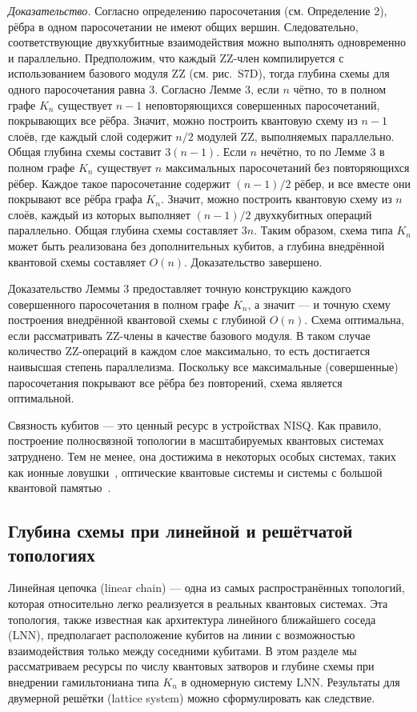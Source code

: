 \textit{Доказательство.} Согласно определению паросочетания (см. Определение
2), рёбра в одном паросочетании не имеют общих вершин. Следовательно,
соответствующие двухкубитные взаимодействия можно выполнять одновременно и
параллельно. Предположим, что каждый ZZ-член компилируется с использованием
базового модуля ZZ (см. рис.~S7D), тогда глубина схемы для одного паросочетания
равна 3. Согласно Лемме 3, если $n$ чётно, то в полном графе $K_n$ существует
$n - 1$ неповторяющихся совершенных паросочетаний, покрывающих все рёбра.
Значит, можно построить квантовую схему из $n - 1$ слоёв, где каждый слой
содержит $n/2$ модулей ZZ, выполняемых параллельно. Общая глубина схемы
составит $3(n - 1)$. Если $n$ нечётно, то по Лемме 3 в полном графе $K_n$
существует $n$ максимальных паросочетаний без повторяющихся рёбер. Каждое такое
паросочетание содержит $(n - 1)/2$ рёбер, и все вместе они покрывают все рёбра
графа $K_n$. Значит, можно построить квантовую схему из $n$ слоёв, каждый из
которых выполняет $(n - 1)/2$ двухкубитных операций параллельно. Общая глубина
схемы составляет $3n$. Таким образом, схема типа $K_n$ может быть реализована
без дополнительных кубитов, а глубина внедрённой квантовой схемы составляет
$O(n)$. Доказательство завершено.

Доказательство Леммы 3 предоставляет точную конструкцию каждого совершенного
паросочетания в полном графе $K_n$, а значит — и точную схему построения
внедрённой квантовой схемы с глубиной $O(n)$. Схема оптимальна, если
рассматривать ZZ-члены в качестве базового модуля. В таком случае количество
ZZ-операций в каждом слое максимально, то есть достигается наивысшая степень
параллелизма. Поскольку все максимальные (совершенные) паросочетания покрывают
все рёбра без повторений, схема является оптимальной.

Связность кубитов — это ценный ресурс в устройствах NISQ. Как правило,
построение полносвязной топологии в масштабируемых квантовых системах
затруднено. Тем не менее, она достижима в некоторых особых системах, таких как
ионные ловушки~\cite{cite_52}, оптические квантовые системы и системы с большой
квантовой памятью~\cite{cite_15}.

\subsection*{Глубина схемы при линейной и решётчатой топологиях}

Линейная цепочка (linear chain) — одна из самых распространённых топологий,
которая относительно легко реализуется в реальных квантовых системах. Эта
топология, также известная как архитектура линейного ближайшего соседа (LNN),
предполагает расположение кубитов на линии с возможностью взаимодействия только
между соседними кубитами. В этом разделе мы рассматриваем ресурсы по числу
квантовых затворов и глубине схемы при внедрении гамильтониана типа $K_n$ в
одномерную систему LNN. Результаты для двумерной решётки (lattice system) можно
сформулировать как следствие.

